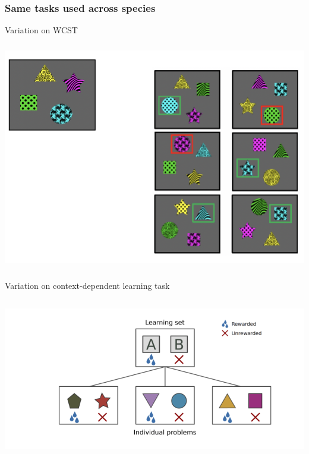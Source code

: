 \documentclass[a0, landscape]{a0poster}
\begin{document}
\begin{multicols}{3}
\subsubsection*{Same tasks used across species}

\begin{minipage}[b]{1\linewidth}
\begin{minipage}[]{0.4\linewidth}
\begin{flushleft}Variation on WCST\end{flushleft}
\includegraphics[height=10cm]{wcst}
\end{minipage}
\hfill
\begin{minipage}[]{0.4\linewidth}
\begin{flushleft}Variation on context-dependent learning task \cite{behrens2018cognitive} \end{flushleft}
\includegraphics[height=7cm]{behrens-paradigm}
\end{minipage}
\end{minipage}


\end{multicols}
\end{document}
